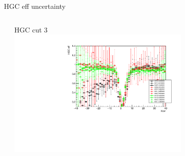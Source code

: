 \documentclass[aspectratio=169,xcolor=dvipsnames]{beamer}
\begin{document}
\begin{frame}{HGC eff uncertainty}
\begin{columns}
\begin{column}[T]{0.5\textwidth}
    \end{column}
     \begin{column}[T]{0.5\textwidth}
     HGC cut 3 \\
     \includegraphics[width = 0.7\textwidth]{results/pid/hgcer/x_Q2_0.35_4.00_3_xcer.pdf}
    \end{column}
    \end{columns}
\end{frame}
\end{document}
